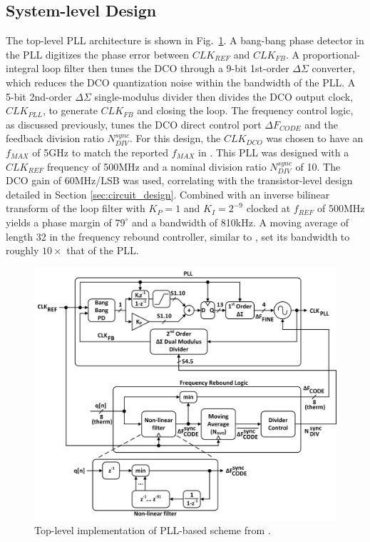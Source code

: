 \documentclass[twoside,9pt,journal,letterpage]{IEEEtran}
\begin{document}
\subsection{System-level Design}
\label{sec:system-level_design}
The top-level PLL architecture is shown in Fig.\ \ref{fig:pll_model}. A bang-bang phase detector in the PLL digitizes the phase error between $CLK_{REF}$ and $CLK_{FB}$. A proportional-integral loop filter then tunes the DCO through a 9-bit 1st-order $\Delta\Sigma$ converter, which reduces the DCO quantization noise within the bandwidth of the PLL. A 5-bit 2nd-order $\Delta\Sigma$ single-modulus divider then divides the DCO output clock, $CLK_{PLL}$, to generate $CLK_{FB}$ and closing the loop. The frequency control logic, as discussed previously, tunes the DCO direct control port $\Delta F_{CODE}$ and the feedback division ratio $N_{DIV}^{sync}$. For this design, the $CLK_{DCO}$ was chosen to have an $f_{MAX}$ of 5GHz to match the reported $f_{MAX}$ in \cite{hashimoto2018}. This PLL was designed with a $CLK_{REF}$ frequency of 500MHz and a nominal division ratio $N_{DIV}^{sync}$ of 10. The DCO gain of 60MHz/LSB was used, correlating with the transistor-level design detailed in Section \ref{sec:circuit_design}. Combined with an inverse bilinear transform of the loop filter with $K_{P}=1$ and $K_{I}=2^{-9}$ clocked at $f_{REF}$ of 500MHz yields a phase margin of $79^{\circ}$ and a bandwidth of 810kHz. A moving average of length 32 in the frequency rebound controller, similar to \cite{hashimoto2018}, set its bandwidth to roughly $10\times$ that of the PLL.

\vspace{-10pt}
\begin{figure}[h]
	\centering
	\includegraphics[width=\columnwidth]{fig_pll_model}
	\caption{Top-level implementation of PLL-based scheme from \cite{hashimoto2018}.}
	\label{fig:pll_model}
\end{figure}
\end{document}
